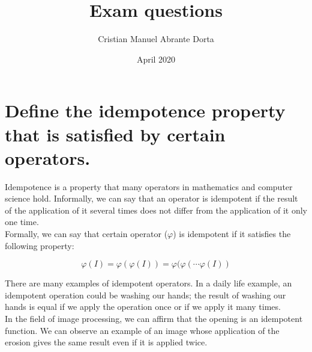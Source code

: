 \documentclass{article}
\title{Exam questions}
\author{Cristian Manuel Abrante Dorta}
\date{April 2020}
\begin{document}
\maketitle

\section{Define the idempotence property that is satisfied by certain operators.}

Idempotence is a property that many operators in mathematics and computer science hold. Informally, we can say that an operator is idempotent if the result of the application of it several times does not differ from the application of it only one time.\\

Formally, we can say that certain operator ($\varphi$) is idempotent if it satisfies the following property:

\begin{equation}
    \varphi(I) = \varphi(\varphi(I)) = \varphi(\varphi(\cdots \varphi(I))
\end{equation}

There are many examples of idempotent operators. In a daily life example, an idempotent operation could be washing our hands; the result of washing our hands is equal if we apply the operation once or if we apply it many times.\\

In the field of image processing, we can affirm that the opening is an idempotent function. We can observe an example of an image whose application of the erosion gives the same result even if it is applied twice.
\end{document}
